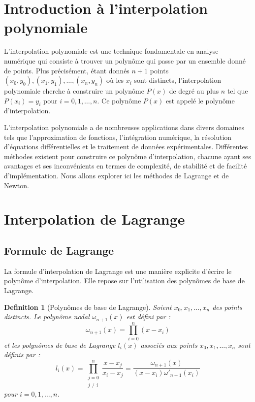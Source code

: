 \documentclass{article}
\newtheorem{definition}{Definition}
\begin{document}
\sloppy

\section{Introduction à l'interpolation polynomiale}

L'interpolation polynomiale est une technique fondamentale en analyse numérique qui consiste à trouver un polynôme qui passe par un ensemble donné de points. Plus précisément, étant donnés $n+1$ points $(x_0, y_0), (x_1, y_1), \dots, (x_n, y_n)$ où les $x_i$ sont distincts, l'interpolation polynomiale cherche à construire un polynôme $P(x)$ de degré au plus $n$ tel que $P(x_i) = y_i$ pour $i = 0, 1, \dots, n$. Ce polynôme $P(x)$ est appelé le polynôme d'interpolation.

L'interpolation polynomiale a de nombreuses applications dans divers domaines tels que l'approximation de fonctions, l'intégration numérique, la résolution d'équations différentielles et le traitement de données expérimentales.  Différentes méthodes existent pour construire ce polynôme d'interpolation, chacune ayant ses avantages et ses inconvénients en termes de complexité, de stabilité et de facilité d'implémentation. Nous allons explorer ici les méthodes de Lagrange et de Newton.

\section{Interpolation de Lagrange}

\subsection{Formule de Lagrange}

La formule d'interpolation de Lagrange est une manière explicite d'écrire le polynôme d'interpolation. Elle repose sur l'utilisation des polynômes de base de Lagrange.

\begin{definition}[Polynômes de base de Lagrange]
Soient $x_0, x_1, \dots, x_n$ des points distincts. Le polynôme nodal $\omega_{n+1}(x)$ est défini par :
\[
\omega_{n+1}(x) = \prod_{i=0}^{n} (x - x_i)
\]
et les polynômes de base de Lagrange $l_i(x)$ associés aux points $x_0, x_1, \dots, x_n$ sont définis par :
\[
l_i(x) = \prod_{\substack{j=0 \\ j \neq i}}^{n} \frac{x - x_j}{x_i - x_j} = \frac{\omega_{n+1}(x)}{(x-x_i)\omega'_{n+1}(x_i)}
\]
pour $i = 0, 1, \dots, n$.
\end{definition}
\end{document}
